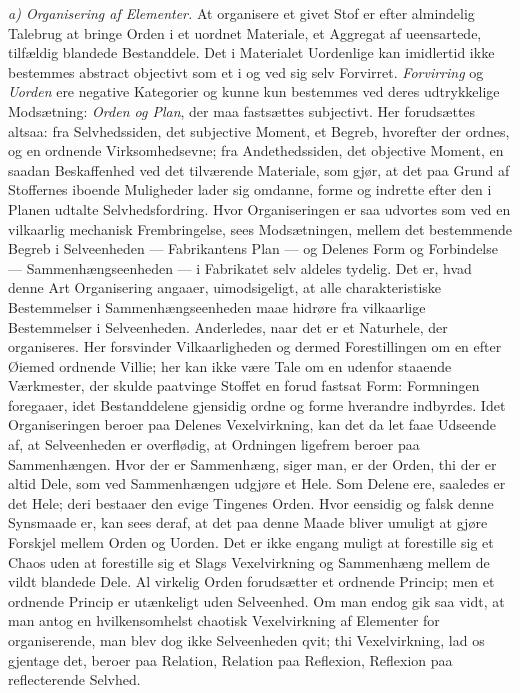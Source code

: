 \documentclass[12pt,a4paper]{book}
\newcommand{\runin}[1]{\emph{#1}\hspace{0.4em}}
\begin{document}
\runin{a) Organisering af Elementer.} At organisere et givet Stof er efter
almindelig Talebrug at bringe Orden i et uordnet Materiale, et Aggregat af
ueensartede, tilfældig blandede Bestanddele. Det i Materialet Uordenlige kan
imidlertid ikke bestemmes abstract objectivt som et i og ved sig selv
Forvirret. \emph{Forvirring} og \emph{Uorden} ere negative Kategorier og kunne
kun bestemmes ved deres udtrykkelige Modsætning: \emph{Orden og Plan}, der maa
fastsættes subjectivt. Her forudsættes altsaa: fra Selvhedssiden, det
subjective Moment, et Begreb, hvorefter der ordnes, og en ordnende
Virksomhedsevne; fra Andethedssiden, det objective Moment, en saadan
Beskaffenhed ved det tilværende Materiale, som gjør, at det paa Grund af
Stoffernes iboende Muligheder lader sig omdanne, forme og indrette efter den i
Planen udtalte Selvhedsfordring. Hvor Organiseringen er saa udvortes som ved en
vilkaarlig mechanisk Frembringelse, sees Modsætningen, mellem det bestemmende
Begreb i Selveenheden --- Fabrikantens Plan --- og Delenes Form og Forbindelse
--- Sammenhængseenheden --- i Fabrikatet selv aldeles tydelig. Det er, hvad
denne Art Organisering angaaer, uimodsigeligt, at alle charakteristiske
Bestemmelser i
Sammenhængseenheden maae hidrøre fra vilkaarlige Bestemmelser i Selveenheden.
Anderledes, naar det er et Naturhele, der organiseres. Her forsvinder
Vilkaarligheden og dermed Forestillingen om en efter Øiemed ordnende Villie;
her kan ikke være Tale om en udenfor staaende Værkmester, der skulde paatvinge
Stoffet en forud fastsat Form: Formningen foregaaer, idet Bestanddelene
gjensidig ordne og forme hverandre indbyrdes. Idet Organiseringen beroer paa
Delenes Vexelvirkning, kan det da let faae Udseende af, at Selveenheden er
overflødig, at Ordningen ligefrem beroer paa Sammenhængen. Hvor der er
Sammenhæng, siger man, er der Orden, thi der er altid Dele, som ved
Sammenhængen udgjøre et Hele. Som Delene ere, saaledes er det Hele; deri
bestaaer den evige Tingenes Orden. Hvor eensidig og falsk denne Synsmaade er,
kan sees deraf, at det paa denne Maade bliver umuligt at gjøre Forskjel mellem
Orden og Uorden. Det er ikke engang muligt at forestille sig et Chaos uden at
forestille sig et Slags Vexelvirkning og Sammenhæng mellem de vildt blandede
Dele. Al virkelig Orden forudsætter et ordnende Princip; men et ordnende
Princip er utænkeligt uden Selveenhed. Om man endog gik saa vidt, at man antog
en hvilkensomhelst chaotisk Vexelvirkning af Elementer for organiserende, man
blev dog ikke Selveenheden qvit; thi Vexelvirkning, lad os gjentage det, beroer
paa Relation, Relation paa Reflexion, Reflexion paa reflecterende Selvhed.
\end{document}
